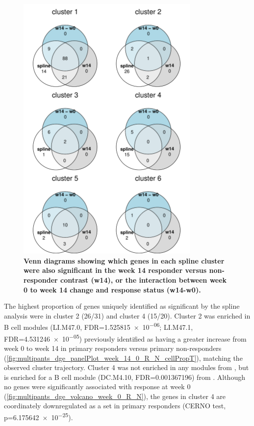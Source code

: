 \begin{figure}
    \centering
    \includegraphics[width=0.8\textwidth,page=1]{mainmatter/figures/chapter_04/plot_gene_set_enrichment.spline_cluster_venns.pdf}
    \caption{
        \textbf{Venn diagrams showing which genes in each spline cluster were also significant in the week 14 responder versus non-responder contrast (w14), or the interaction between week 0 to week 14 change and response status (w14-w0).}
    }
    \label{fig:plot_gene_set_enrichment.spline_cluster_venns.pdf}
\end{figure}

The highest proportion of genes uniquely identified as significant by the spline analysis were in cluster 2 (26/31) and cluster 4 (15/20).
Cluster 2 was enriched in \autocite{li2013MolecularSignaturesAntibody} B cell modules (LI.M47.0, FDR=\num{1.525815e-06}; LI.M47.1, FDR=\num{4.531246e-05})
previously identified as having a greater increase from week 0 to week 14 in primary responders versus primary non-responders (\cref{fig:multipants_dge_panelPlot_week_14_0_R_N_cellPropT}),
matching the observed cluster trajectory.
Cluster 4 was not enriched in any modules from \textcite{li2013MolecularSignaturesAntibody}, but is enriched for a B cell module (DC.M4.10, FDR=\num{0.001367196}) from \textcite{chaussabel2008ModularAnalysisFramework}.
Although no genes were significantly associated with response at week 0 (\cref{fig:multipants_dge_volcano_week_0_R_N}),
the genes in cluster 4 are coordinately downregulated as a set in primary responders (CERNO test, p=\num{6.175642e-25}).

